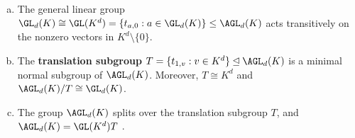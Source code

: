 \begin{proposition}\label{prop:subgroups_of_agl}
    \begin{enumerate}[(a)]
        \item The general linear group $\GL_d(K) \cong \GL(K^d) = \{t_{a,0} : a \in \GL_d(K)\} \leq \AGL_d(K)$ acts transitively on the nonzero vectors in $K^d \setminus \{0\}$.
        \item The \textbf{translation subgroup} $T = \{t_{1,v} : v \in K^d\} \unlhd \AGL_d(K)$ is a minimal normal subgroup of $\AGL_d(K)$. Moreover, $T \cong K^d$ and $\AGL_d(K)/T \cong \GL_d(K)$. %
        \item The group $\AGL_d(K)$ splits over the translation subgroup $T$, and $\AGL_d(K) = \GL(K^d)T$ .
    \end{enumerate}
\end{proposition}

